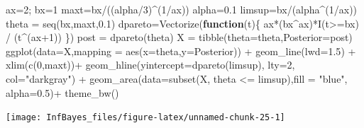 \documentclass[
]{book}
\newenvironment{Shaded}{\begin{snugshade}}{\end{snugshade}}
\newcommand{\AttributeTok}[1]{\textcolor[rgb]{0.77,0.63,0.00}{#1}}
\newcommand{\ControlFlowTok}[1]{\textcolor[rgb]{0.13,0.29,0.53}{\textbf{#1}}}
\newcommand{\DecValTok}[1]{\textcolor[rgb]{0.00,0.00,0.81}{#1}}
\newcommand{\FloatTok}[1]{\textcolor[rgb]{0.00,0.00,0.81}{#1}}
\newcommand{\FunctionTok}[1]{\textcolor[rgb]{0.00,0.00,0.00}{#1}}
\newcommand{\NormalTok}[1]{#1}
\newcommand{\OtherTok}[1]{\textcolor[rgb]{0.56,0.35,0.01}{#1}}
\newcommand{\SpecialCharTok}[1]{\textcolor[rgb]{0.00,0.00,0.00}{#1}}
\newcommand{\StringTok}[1]{\textcolor[rgb]{0.31,0.60,0.02}{#1}}
\begin{document}
\begin{Shaded}
\begin{Highlighting}[]
\NormalTok{ax}\OtherTok{=}\DecValTok{2}\NormalTok{; bx}\OtherTok{=}\DecValTok{1}
\NormalTok{maxt}\OtherTok{=}\NormalTok{bx}\SpecialCharTok{/}\NormalTok{((alpha}\SpecialCharTok{/}\DecValTok{3}\NormalTok{)}\SpecialCharTok{\^{}}\NormalTok{(}\DecValTok{1}\SpecialCharTok{/}\NormalTok{ax))}
\NormalTok{alpha}\OtherTok{=}\FloatTok{0.1}
\NormalTok{limsup}\OtherTok{=}\NormalTok{bx}\SpecialCharTok{/}\NormalTok{(alpha}\SpecialCharTok{\^{}}\NormalTok{(}\DecValTok{1}\SpecialCharTok{/}\NormalTok{ax))}
\NormalTok{theta }\OtherTok{=} \FunctionTok{seq}\NormalTok{(bx,maxt,}\FloatTok{0.1}\NormalTok{)}
\NormalTok{dpareto}\OtherTok{=}\FunctionTok{Vectorize}\NormalTok{(}\ControlFlowTok{function}\NormalTok{(t)\{}
\NormalTok{  ax}\SpecialCharTok{*}\NormalTok{(bx}\SpecialCharTok{\^{}}\NormalTok{ax)}\SpecialCharTok{*}\FunctionTok{I}\NormalTok{(t}\SpecialCharTok{\textgreater{}=}\NormalTok{bx) }\SpecialCharTok{/}\NormalTok{ (t}\SpecialCharTok{\^{}}\NormalTok{(ax}\SpecialCharTok{+}\DecValTok{1}\NormalTok{)) \})}
\NormalTok{post }\OtherTok{=} \FunctionTok{dpareto}\NormalTok{(theta)}
\NormalTok{X }\OtherTok{=} \FunctionTok{tibble}\NormalTok{(}\AttributeTok{theta=}\NormalTok{theta,}\AttributeTok{Posterior=}\NormalTok{post)}
\FunctionTok{ggplot}\NormalTok{(}\AttributeTok{data=}\NormalTok{X,}\AttributeTok{mapping =} \FunctionTok{aes}\NormalTok{(}\AttributeTok{x=}\NormalTok{theta,}\AttributeTok{y=}\NormalTok{Posterior)) }\SpecialCharTok{+}
  \FunctionTok{geom\_line}\NormalTok{(}\AttributeTok{lwd=}\FloatTok{1.5}\NormalTok{) }\SpecialCharTok{+}
  \FunctionTok{xlim}\NormalTok{(}\FunctionTok{c}\NormalTok{(}\DecValTok{0}\NormalTok{,maxt))}\SpecialCharTok{+}
  \FunctionTok{geom\_hline}\NormalTok{(}\AttributeTok{yintercept=}\FunctionTok{dpareto}\NormalTok{(limsup), }\AttributeTok{lty=}\DecValTok{2}\NormalTok{, }\AttributeTok{col=}\StringTok{"darkgray"}\NormalTok{) }\SpecialCharTok{+}
  \FunctionTok{geom\_area}\NormalTok{(}\AttributeTok{data=}\FunctionTok{subset}\NormalTok{(X, theta }\SpecialCharTok{\textless{}=}\NormalTok{ limsup),}\AttributeTok{fill =} \StringTok{"blue"}\NormalTok{, }\AttributeTok{alpha=}\FloatTok{0.5}\NormalTok{)}\SpecialCharTok{+}
  \FunctionTok{theme\_bw}\NormalTok{()}
\end{Highlighting}
\end{Shaded}

\begin{center}\texttt{[image: InfBayes\_files/figure-latex/unnamed-chunk-25-1]} \end{center}
\end{document}
